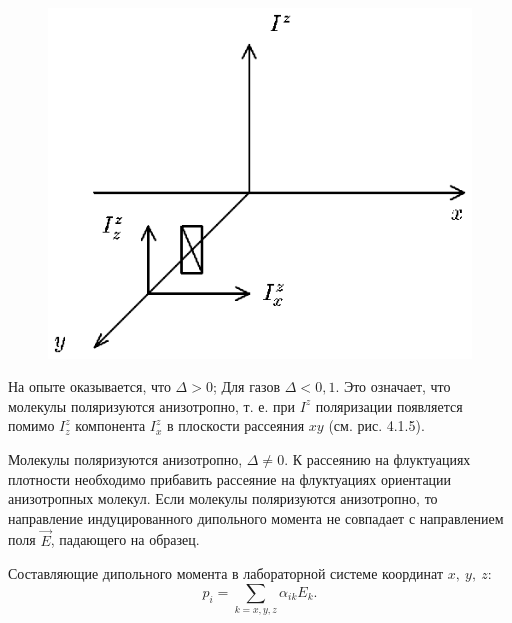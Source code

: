 \begin{figure}[tbp]
\centerline{\hbox{\includegraphics[scale=0.9]{Ris/ris_eps/ris4_1_05.eps}}}

\end{figure}


На опыте оказывается, что $\Delta>0$; Для газов $\Delta<0,1$. Это
означает, что молекулы поляризуются анизотропно, т. е. при $I^z$
поляризации появляется помимо $I_{z}^z$ компонента $I_x^z$ в
плоскости рассеяния $xy$ (см. рис. 4.1.5).\par
{}
Молекулы поляризуются анизотропно, $\Delta\not=0$. К рассеянию на
флуктуациях плотности необходимо прибавить рассеяние на
флуктуациях ориентации анизотропных молекул. Если молекулы
поляризуются анизотропно, то направление индуцированного
дипольного момента не совпадает с направлением поля $\vec E$,
падающего на образец.

Составляющие дипольного момента в лабораторной системе координат
$x,\ y,\ z$:
$$p_i=\sum\limits_{k=x,y,z}\alpha_{ik}E_k.$$

